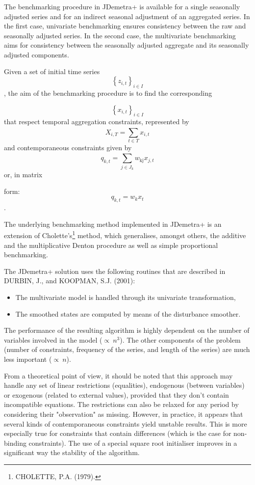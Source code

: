 \documentclass[
  letterpaper,
  DIV=11,
  numbers=noendperiod]{scrreprt}
\begin{document}
The benchmarking procedure in JDemetra+ is available for a single
seasonally adjusted series and for an indirect seasonal adjustment of an
aggregated series. In the first case, univariate benchmarking ensures
consistency between the raw and seasonally adjusted series. In the
second case, the multivariate benchmarking aims for consistency between
the seasonally adjusted aggregate and its seasonally adjusted
components.

Given a set of initial time series
\[\left\{ z_{i,t} \right\}_{i \in I}\], the aim of the benchmarking
procedure is to find the corresponding

\[\left\{ x_{i,t} \right\}_{i \in I}\] that respect temporal aggregation
constraints, represented by \[X_{i,T} = \sum_{t \in T}^{}x_{i,t}\] and
contemporaneous constraints given by
\[q_{k,t} = \sum_{j \in J_{k}}^{}{w_{\text{kj}}x_{j,t}}\] or, in matrix

form: \[q_{k,t} = w_{k}x_{t}\].

The underlying benchmarking method implemented in JDemetra+ is an
extension of Cholette's\footnote{CHOLETTE, P.A. (1979).} method, which
generalises, amongst others, the additive and the multiplicative Denton
procedure as well as simple proportional benchmarking.

The JDemetra+ solution uses the following routines that are described in
DURBIN, J., and KOOPMAN, S.J. (2001):

\begin{itemize}
\item
  The multivariate model is handled through its univariate
  transformation,
\item
  The smoothed states are computed by means of the disturbance smoother.
\end{itemize}

The performance of the resulting algorithm is highly dependent on the
number of variables involved in the model (\(\propto \ n^{3}\)). The
other components of the problem (number of constraints, frequency of the
series, and length of the series) are much less important
(\(\propto \ n\)).

From a theoretical point of view, it should be noted that this approach
may handle any set of linear restrictions (equalities), endogenous
(between variables) or exogenous (related to external values), provided
that they don't contain incompatible equations. The restrictions can
also be relaxed for any period by considering their "observation" as
missing. However, in practice, it appears that several kinds of
contemporaneous constraints yield unstable results. This is more
especially true for constraints that contain differences (which is the
case for non-binding constraints). The use of a special square root
initialiser improves in a significant way the stability of the
algorithm.
\end{document}
